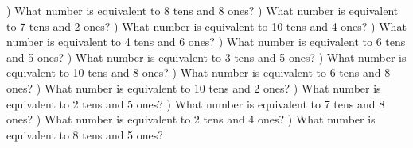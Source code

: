 \documentclass{article}%
\begin{document}
\newline%
\newline%
) What number is equivalent to 8 tens and 8 ones?%
\newline%
\newline%
) What number is equivalent to 7 tens and 2 ones?%
\newline%
\newline%
) What number is equivalent to 10 tens and 4 ones?%
\newline%
\newline%
) What number is equivalent to 4 tens and 6 ones?%
\newline%
\newline%
) What number is equivalent to 6 tens and 5 ones?%
\newline%
\newline%
) What number is equivalent to 3 tens and 5 ones?%
\newline%
\newline%
) What number is equivalent to 10 tens and 8 ones?%
\newline%
\newline%
) What number is equivalent to 6 tens and 8 ones?%
\newline%
\newline%
) What number is equivalent to 10 tens and 2 ones?%
\newline%
\newline%
) What number is equivalent to 2 tens and 5 ones?%
\newline%
\newline%
) What number is equivalent to 7 tens and 8 ones?%
\newline%
\newline%
) What number is equivalent to 2 tens and 4 ones?%
\newline%
\newline%
) What number is equivalent to 8 tens and 5 ones?%
\end{document}
